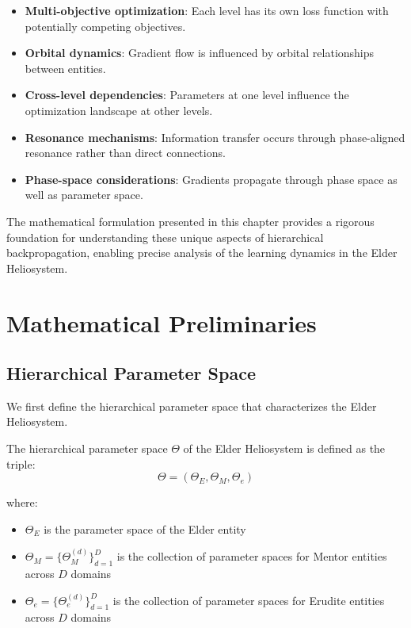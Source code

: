 \begin{itemize}
    \item \textbf{Multi-objective optimization}: Each level has its own loss function with potentially competing objectives.
    \item \textbf{Orbital dynamics}: Gradient flow is influenced by orbital relationships between entities.
    \item \textbf{Cross-level dependencies}: Parameters at one level influence the optimization landscape at other levels.
    \item \textbf{Resonance mechanisms}: Information transfer occurs through phase-aligned resonance rather than direct connections.
    \item \textbf{Phase-space considerations}: Gradients propagate through phase space as well as parameter space.
\end{itemize}

The mathematical formulation presented in this chapter provides a rigorous foundation for understanding these unique aspects of hierarchical backpropagation, enabling precise analysis of the learning dynamics in the Elder Heliosystem.

\section{Mathematical Preliminaries}

\subsection{Hierarchical Parameter Space}

We first define the hierarchical parameter space that characterizes the Elder Heliosystem.

\begin{definition}
The hierarchical parameter space $\Theta$ of the Elder Heliosystem is defined as the triple:
\begin{equation}
\Theta = (\Theta_E, \Theta_M, \Theta_e)
\end{equation}

where:
\begin{itemize}
    \item $\Theta_E$ is the parameter space of the Elder entity
    \item $\Theta_M = \{\Theta_M^{(d)}\}_{d=1}^D$ is the collection of parameter spaces for Mentor entities across $D$ domains
    \item $\Theta_e = \{\Theta_e^{(d)}\}_{d=1}^D$ is the collection of parameter spaces for Erudite entities across $D$ domains
\end{itemize}
\end{definition}

